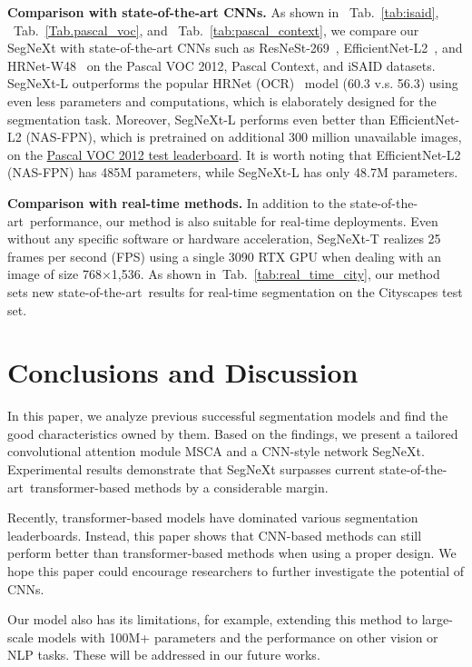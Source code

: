 \documentclass{article}
\def\sArt{state-of-the-art~}
\newcommand{\tabref}[1]{Tab.~\ref{#1}}
\begin{document}
\textbf{Comparison with state-of-the-art CNNs.}
As shown in ~\tabref{tab:isaid}, ~\tabref{Tab.pascal_voc}, and ~\tabref{tab:pascal_context},
we compare our SegNeXt with state-of-the-art CNNs 
such as ResNeSt-269~\cite{zhang2020resnest}, EfficientNet-L2~\cite{zoph2020rethinking},
and HRNet-W48~\cite{wang2020deep} on the Pascal VOC 2012, Pascal Context, and iSAID datasets.
SegNeXt-L outperforms the popular HRNet (OCR)~\cite{wang2020deep,yuan2020object} model (60.3 v.s. 56.3) using even less parameters and computations, which is elaborately designed for the segmentation task.
Moreover, SegNeXt-L performs even better than EfficientNet-L2 (NAS-FPN), which is
pretrained on additional 300 million unavailable images, on the \href{http://host.robots.ox.ac.uk:8080/anonymous/HRSC5B.html}{Pascal VOC 2012 test leaderboard}.
It is worth noting that EfficientNet-L2 (NAS-FPN) has 485M parameters, while SegNeXt-L has only 48.7M parameters.


\textbf{Comparison with real-time methods.} 
In addition to the \sArt performance, our method is also suitable for real-time deployments.
Even without any specific software or hardware acceleration, SegNeXt-T realizes 25 frames per second (FPS) using a single 3090 RTX GPU when dealing with an image of size 768$\times$1,536.
As shown in~\tabref{tab:real_time_city}, our method sets new \sArt results for real-time segmentation on the Cityscapes test set.




\section{Conclusions and Discussion}

In this paper, we analyze previous successful segmentation models and
find the good characteristics owned by them.
Based on the findings, we present a tailored convolutional attention module MSCA and a 
CNN-style network SegNeXt.
Experimental results demonstrate that 
SegNeXt surpasses current \sArt transformer-based methods by a considerable margin.


Recently, transformer-based models have dominated various segmentation leaderboards.
Instead, this paper shows that CNN-based methods can still perform better than transformer-based methods when using a proper design.
We hope this paper could encourage researchers to further investigate the potential of CNNs.

Our model also has its limitations, for example, extending this method to large-scale models with 100M+ parameters and the performance on other vision or NLP tasks.
These will be addressed in our future works.
\end{document}
